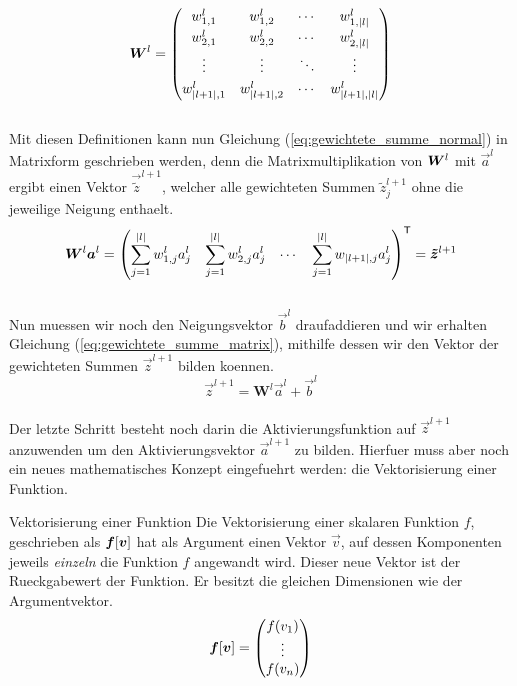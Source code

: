 \begin{equation*}
  \bm{W}^l =
  \begin{pmatrix}
    w_{1,1}^l & w_{1,2}^l & \cdots & w_{1,|l|}^l \\[0.3em]
    w_{2,1}^l & w_{2,2}^l & \cdots & w_{2,|l|}^l \\[0.3em]
    \vdots & \vdots & \ddots & \vdots \\[0.3em]
    w_{|l+1|,1}^l & w_{|l+1|,2}^l & \cdots & w_{|l+1|,|l|}^l
  \end{pmatrix}
\end{equation*}
\\
Mit diesen Definitionen kann nun Gleichung (\ref{eq:gewichtete_summe_normal}) in
Matrixform geschrieben werden, denn die Matrixmultiplikation von $\bm{W}^l$ mit
$\vec{a}^{l}$ ergibt einen Vektor $\vec{\tilde{z}}^{l+1}$, welcher alle gewichteten
Summen $\tilde{z}_j^{l+1}$ ohne die jeweilige Neigung enthaelt.
\\
\begin{equation*}
  \bm{W}^l \bm{a}^{l} = \begin{pmatrix}\displaystyle \sum_{j=1}^{|l|} w_{1,j}^l a_j^l &\displaystyle \sum_{j=1}^{|l|} w_{2,j}^l a_j^l & \cdots &\displaystyle \sum_{j=1}^{|l|} w_{|l+1|,j} a_j^l \end{pmatrix}^{\mathsf{T}} = \bm{\tilde{z}}^{l+1}
\end{equation*}
\\
Nun muessen wir noch den Neigungsvektor $\vec{b}^l$ draufaddieren und wir
erhalten Gleichung (\ref{eq:gewichtete_summe_matrix}), mithilfe dessen wir den
Vektor der gewichteten Summen $\vec{z}^{l+1}$ bilden koennen.
\\
\begin{equation}\tag{FP1a}\label{eq:gewichtete_summe_matrix}
  \vec{z}^{l+1} = \mathbf{W}^{l} \vec{a}^{l} + \vec{b}^{l}
\end{equation}
\\
Der letzte Schritt besteht noch darin die Aktivierungsfunktion auf $\vec{z}^{l+1}$
anzuwenden um den Aktivierungsvektor $\vec{a}^{l+1}$ zu bilden.
Hierfuer muss aber noch ein neues mathematisches
Konzept eingefuehrt werden: die Vektorisierung einer Funktion.
\para{}

\begin{defbox}{Vektorisierung einer Funktion}
  Die Vektorisierung einer skalaren Funktion $f$, geschrieben als
  $\bm{f}[\bm{v}]$ hat als Argument einen Vektor $\vec{v}$, auf dessen
  Komponenten jeweils \textit{einzeln} die Funktion $f$ angewandt wird. Dieser neue
  Vektor ist der Rueckgabewert der Funktion. Er besitzt die gleichen Dimensionen
  wie der Argumentvektor.
  \\
  \begin{equation*}
    \bm{f}[\bm{v}]=
    \begin{pmatrix}
      f(v_1)\\
      \vdots \\
      f(v_n)\\
    \end{pmatrix}
  \end{equation*}
\end{defbox}

